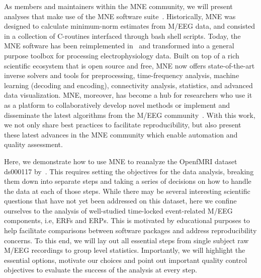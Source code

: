 As members and maintainers within the MNE community, we will present analyses that make use of the MNE software suite~\citep{mne}. Historically, MNE was designed to calculate minimum-norm estimates from M/EEG data, and consisted in a collection of C-routines interfaced through bash shell scripts. Today, the MNE software has been reimplemented in~\citep{gramfort2013meg} and transformed into a general purpose toolbox for processing electrophysiology data. Built on top of a rich scientific ecosystem that is open source and free, MNE now offers state-of-the-art inverse solvers and tools for preprocessing, time-frequency analysis, machine learning (decoding and encoding), connectivity analysis, statistics, and advanced data visualization. MNE, moreover, has become a hub for researchers who use it as a platform to collaboratively develop novel methods or implement and disseminate the latest algorithms from the M/EEG community~\citep{engemann2015automated, smith2015regression1, smith2015regression2, haufe2014interpretation, king2014characterizing, gramfort-etal:2013, schurger2013reducing, khan2013note, larson_cortical_2012, hauk2011comparison, gramfort2010graph, rivet2009xdawn, kriegeskorte2008representational, maris_nonparametric_2007}. With this work, we not only  share best practices to facilitate reproducibility, but also present these latest advances in the MNE community which enable automation and quality assessment.

Here, we demonstrate how to use MNE to reanalyze the OpenfMRI dataset ds000117 by~\cite{wakeman2015multi}. This requires setting the objectives for the data analysis, breaking them down into separate steps and taking a series of decisions on how to handle the data at each of those steps. While there may be several interesting scientific questions that have not yet been addressed on this dataset, here we confine ourselves to the analysis of well-studied time-locked event-related M/EEG components, i.e, \acp{ERF} and \acp{ERP}. This is motivated by educational purposes to help facilitate comparisons between software packages and address reproducibility concerns. To this end, we will lay out all essential steps from single subject raw M/EEG recordings to group level statistics. Importantly, we will highlight the essential options, motivate our choices and point out important quality control objectives to evaluate the success of the analysis at every step.

